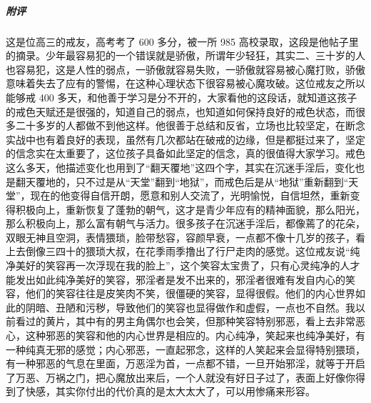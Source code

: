 \begin{case}
    \subparagraph{附评} 这是位高三的戒友，高考考了 600 多分，被一所 985 高校录取，这段是他帖子里的摘录。少年最容易犯的一个错误就是骄傲，所谓年少轻狂，其实二、三十岁的人也容易犯，这是人性的弱点，一骄傲就容易失败，一骄傲就容易被心魔打败，骄傲意味着失去了应有的警惕，在这种心理状态下很容易被心魔攻破。这位戒友之所以能够戒 400 多天，和他善于学习是分不开的，大家看他的这段话，就知道这孩子的戒色天赋还是很强的，知道自己的弱点，也知道如何保持良好的戒色状态，而很多二十多岁的人都做不到他这样。他很善于总结和反省，立场也比较坚定，在断念实战中也有着良好的表现，虽然有几次都站在破戒的边缘，但是都挺过来了，坚定的信念实在太重要了，这位孩子具备如此坚定的信念，真的很值得大家学习。戒色这么多天，他描述变化也用到了“翻天覆地”这四个字，其实在沉迷手淫后，变化也是翻天覆地的，只不过是从“天堂”翻到“地狱”，而戒色后是从“地狱”重新翻到“天堂”，现在的他变得自信开朗，愿意和别人交流了，光明愉悦，自信坦然，重新变得积极向上，重新恢复了蓬勃的朝气，这才是青少年应有的精神面貌，那么阳光，那么积极向上，那么富有朝气与活力。很多孩子在沉迷手淫后，都像蔫了的花朵，双眼无神且空洞，表情猥琐，脸带愁容，容颜早衰，一点都不像十几岁的孩子，看上去倒像三四十的猥琐大叔，在花季雨季撸出了行尸走肉的感觉。这位戒友说“纯净美好的笑容再一次浮现在我的脸上”，这个笑容太宝贵了，只有心灵纯净的人才能发出如此纯净美好的笑容，邪淫者是发不出来的，邪淫者很难有发自内心的笑容，他们的笑容往往是皮笑肉不笑，很僵硬的笑容，显得很假。他们的内心世界如此的阴暗、丑陋和污秽，导致他们的笑容也显得做作和虚假，一点也不自然。我以前看过的黄片，其中有的男主角偶尔也会笑，但那种笑容特别邪恶，看上去非常恶心，这种邪恶的笑容和他的内心世界是相应的。内心纯净，笑起来也纯净美好，有一种纯真无邪的感觉；内心邪恶，一直起邪念，这样的人笑起来会显得特别猥琐，有一种邪恶的气息在里面，万恶淫为首，一点都不错，一旦开始邪淫，就等于开启了万恶、万祸之门，把心魔放出来后，一个人就没有好日子过了，表面上好像你得到了快感，其实你付出的代价真的是太大太大了，可以用惨痛来形容。


\end{case}
